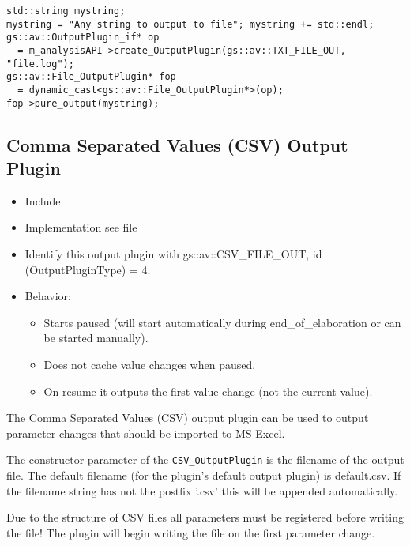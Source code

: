 \begin{lstlisting}[caption={Text-file \textsl{pure} output example}, label=lst:fileOutputPluginPureEx]
std::string mystring;
mystring = "Any string to output to file"; mystring += std::endl;
gs::av::OutputPlugin_if* op 
  = m_analysisAPI->create_OutputPlugin(gs::av::TXT_FILE_OUT, "file.log");
gs::av::File_OutputPlugin* fop 
  = dynamic_cast<gs::av::File_OutputPlugin*>(op);
fop->pure_output(mystring);
\end{lstlisting}


\subsection{Comma Separated Values (CSV) Output Plugin}
\label{GAVOPcsv}

\begin{itemize}
  \item Include 
  \item Implementation see file 
  \item Identify this output plugin with {\sffamily gs::av::CSV\_FILE\_OUT}, \newline
           id ({\sffamily OutputPluginType}) = 4.
  \item Behavior:
    \begin{itemize}
        \item Starts paused (will start automatically during end\_of\_elaboration or can be started manually).
        \item Does not cache value changes when paused.
        \item On resume it outputs the first value change (not the current value).
    \end{itemize}
\end{itemize}

The Comma Separated Values (CSV) output plugin can be used to output parameter changes that should be imported to MS Excel.

The constructor parameter of the \lstinline|CSV_OutputPlugin| is the filename of the output file. The default filename (for the plugin's default output plugin) is {\sffamily default.csv}. If the filename string has not the postfix '{\sffamily .csv}' this will be appended automatically.

    Due to the structure of CSV files all parameters must be registered before
    writing the file! The plugin will begin writing the file on the first parameter change.

